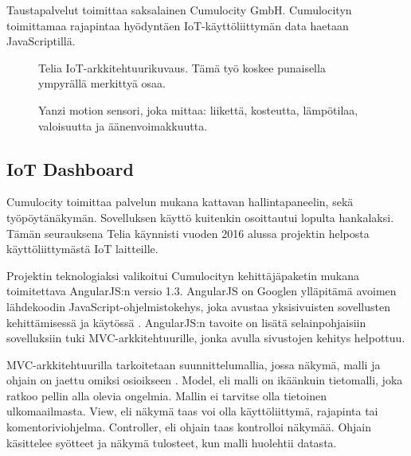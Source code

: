 \documentclass{tktltiki}
\begin{document}
Taustapalvelut toimittaa saksalainen Cumulocity GmbH. Cumulocityn toimittamaa rajapintaa hyödyntäen IoT-käyttöliittymän data haetaan JavaScriptillä. 

\begin{figure}[h]
\begin{center}
\caption{Telia IoT-arkkitehtuurikuvaus. Tämä työ koskee punaisella ympyrällä merkittyä osaa.}
\label{Arkkitehtuurikuvaus}
\end{center}
\end{figure}


\begin{figure}[h]
\begin{center}
\caption{Yanzi motion sensori, joka mittaa: liikettä, kosteutta, lämpötilaa, valoisuutta ja äänenvoimakkuutta.}
\label{Yanzi sensori}
\end{center}
\end{figure}

\clearpage

\subsection{IoT Dashboard}

Cumulocity toimittaa palvelun mukana kattavan hallintapaneelin, sekä työpöytänäkymän. Sovelluksen käyttö kuitenkin osoittautui lopulta hankalaksi. Tämän seurauksena Telia käynnisti vuoden 2016 alussa projektin helposta käyttöliittymästä IoT laitteille. 

Projektin teknologiaksi valikoitui Cumulocityn kehittäjäpaketin mukana toimitettava AngularJS:n versio 1.3. AngularJS on Googlen ylläpitämä avoimen lähdekoodin JavaScript-ohjelmistokehys, joka avustaa yksisivuisten sovellusten kehittämisessä ja käytössä \cite{jain2015angularjs}. AngularJS:n tavoite on lisätä selainpohjaisiin sovelluksiin tuki MVC-arkkitehtuurille, jonka avulla sivustojen kehitys helpottuu. 

MVC-arkkitehtuurilla tarkoitetaan suunnittelumallia, jossa näkymä, malli ja ohjain on jaettu omiksi osioikseen \cite{deacon2009model}. Model, eli malli on ikäänkuin tietomalli, joka ratkoo pellin alla olevia ongelmia. Mallin ei tarvitse olla tietoinen ulkomaailmasta. View, eli näkymä taas voi olla käyttöliittymä, rajapinta tai komentoriviohjelma. Controller, eli ohjain taas kontrolloi näkymää. Ohjain käsittelee syötteet ja näkymä tulosteet, kun malli huolehtii datasta. 
\end{document}
